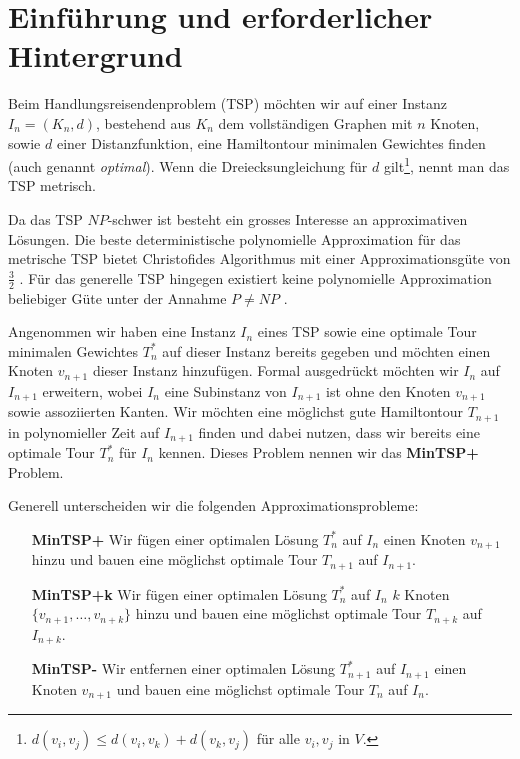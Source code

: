 \documentclass[12pt]{article}
\title{\titleVar}
\author{\authorVar}
\date{3. Juni 2020}
\begin{document}
	
	
	\maketitle
	
	
	\thispagestyle{fancy}
	
	
	
	
	\section*{Einführung und erforderlicher Hintergrund}
	Beim Handlungsreisendenproblem (TSP) möchten wir auf einer Instanz $I_{n} = (K_{n},d)$, bestehend aus $K_n$ dem vollständigen Graphen mit $n$ Knoten, sowie $d$ einer Distanzfunktion, eine Hamiltontour minimalen Gewichtes finden (auch genannt \textit{optimal}). Wenn die Dreiecksungleichung für $d$ gilt\footnote{$d(v_i,v_j)\leq d(v_i,v_k) + d(v_k,v_j)$ für alle $v_i,v_j$ in $V$. }, nennt man das TSP metrisch.
	
	Da das TSP $NP$-schwer ist \cite{cormen_introduction_2009} besteht ein grosses Interesse an approximativen Lösungen. Die beste  deterministische polynomielle Approximation für das metrische TSP bietet Christofides Algorithmus mit einer Approximationsgüte von $\frac{3}{2}$ \cite{golovnev_cccomplexity_2019}. Für das generelle TSP hingegen existiert keine polynomielle Approximation beliebiger Güte unter der Annahme $P\not = NP$ \cite{golovnev_cccomplexity_2019}.
	
	Angenommen wir haben eine Instanz $I_n$ eines TSP sowie eine optimale Tour minimalen Gewichtes $T_n^*$ auf dieser Instanz bereits gegeben und möchten einen Knoten $v_{n+1}$ dieser Instanz hinzufügen. Formal ausgedrückt möchten wir $I_n$ auf $I_{n+1}$ erweitern, wobei $I_n$ eine Subinstanz von $I_{n+1}$ ist ohne den Knoten $v_{n+1}$ sowie assoziierten Kanten. Wir möchten eine möglichst gute Hamiltontour $T_{n+1}$ in polynomieller Zeit auf $I_{n+1}$ finden und dabei nutzen, dass wir bereits eine optimale Tour $T_n^*$ für $I_{n}$ kennen. Dieses Problem nennen wir das \textbf{MinTSP+} Problem.
	
	Generell unterscheiden wir die folgenden Approximationsprobleme:
	
	\begin{itemize}[leftmargin=1in]
		\item[\textbf{MinTSP+}] Wir fügen einer optimalen Lösung $T_{n}^*$ auf $I_n$ einen Knoten $v_{n+1}$ hinzu und bauen eine möglichst optimale Tour $T_{n+1}$ auf $I_{n+1}$.
		\item [\textbf{MinTSP+k}] Wir fügen einer optimalen Lösung $T_n^*$ auf $I_n$ $k$ Knoten $\{v_{n+1},\ldots,v_{n+k}\}$ hinzu und bauen eine möglichst optimale Tour $T_{n+k}$ auf $I_{n+k}$.
		\item [\textbf{MinTSP-}] Wir entfernen einer optimalen Lösung $T_{n+1}^*$ auf $I_{n+1}$ einen Knoten $v_{n+1}$ und bauen eine möglichst optimale Tour $T_n$ auf $I_n$. 
	\end{itemize}
	
\end{document}
